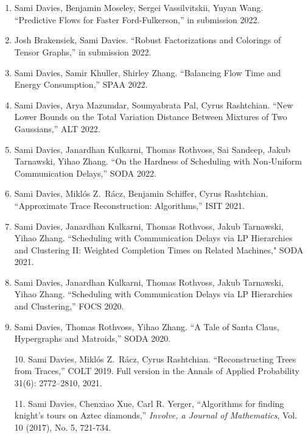 \documentclass[12 pt]{article}
\newcommand{\lineunder}{\vspace*{-8pt} \\ \hspace*{-18pt} \hrulefill \\}
\newcommand{\header}[1]{{\hspace*{-15pt}\vspace*{6pt} \selectfont{\textsc{#1}}} \vspace*{-6pt} \lineunder}
\begin{document}
\header{Publications}
\begin{enumerate}
\item Sami Davies, Benjamin Moseley, Sergei Vassilvitskii, Yuyan Wang. ``Predictive Flows for Faster Ford-Fulkerson,'' in submission 2022.
\item Josh Brakensiek, Sami Davies. ``Robust Factorizations and Colorings of Tensor Graphs,'' in submission	2022.
\item Sami Davies, Samir Khuller, Shirley Zhang. ``Balancing Flow Time and Energy Consumption,'' SPAA 2022.\\
\item Sami Davies, Arya Mazumdar, Soumyabrata Pal, Cyrus Rashtchian. ``New Lower Bounds on the Total Variation Distance Between Mixtures of Two Gaussians,'' ALT 2022. \\
\item Sami Davies, Janardhan Kulkarni, Thomas Rothvoss, Sai Sandeep, Jakub Tarnawski, Yihao Zhang. ``On the Hardness of Scheduling with Non-Uniform Communication Delays,'' SODA 2022.\\	
\item Sami Davies, 	Mikl\'os Z.\ R\'acz, Benjamin Schiffer, Cyrus Rashtchian. ``Approximate Trace Reconstruction: Algorithms,'' ISIT 2021.\\
\item Sami Davies, Janardhan Kulkarni, Thomas Rothvoss, Jakub Tarnawski, Yihao Zhang.  ``Scheduling with Communication Delays via LP Hierarchies and Clustering II: Weighted Completion Times on Related Machines," SODA 2021.\\
\item Sami Davies, Janardhan Kulkarni, Thomas Rothvoss, Jakub Tarnawski, Yihao Zhang. ``Scheduling with Communication Delays via LP Hierarchies and Clustering,'' FOCS 2020. \\
\item Sami Davies, Thomas Rothvoss, Yihao Zhang. ``A Tale of Santa Claus, Hypergraphs and Matroids,'' SODA 2020.
\end{enumerate}
\clearpage
\begin{enumerate} 
\item[10.] Sami Davies, 	Mikl\'os Z.\ R\'acz, Cyrus Rashtchian. ``Reconstructing Trees from Traces,'' COLT 2019. Full version in the Annals of Applied Probability 31(6): 2772--2810, 2021.
\item[11.] Sami Davies, Chenxiao Xue, Carl R. Yerger, ``Algorithms for finding knight's tours on Aztec diamonds,'' 
\textit{Involve, a Journal of Mathematics}, Vol. 10 (2017), No. 5, 721-734.
\end{enumerate}
\end{document}
